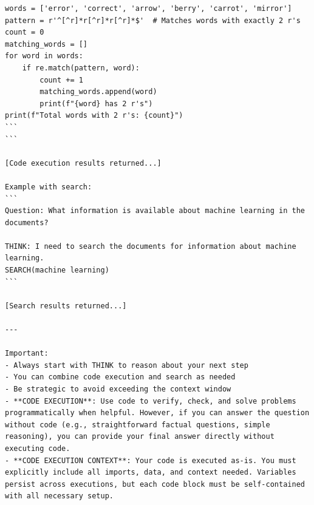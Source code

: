 \begin{lstlisting}[style=customstyle]
words = ['error', 'correct', 'arrow', 'berry', 'carrot', 'mirror']
pattern = r'^[^r]*r[^r]*r[^r]*$'  # Matches words with exactly 2 r's
count = 0
matching_words = []
for word in words:
    if re.match(pattern, word):
        count += 1
        matching_words.append(word)
        print(f"{word} has 2 r's")
print(f"Total words with 2 r's: {count}")
```
```

[Code execution results returned...]

Example with search:
```
Question: What information is available about machine learning in the documents?

THINK: I need to search the documents for information about machine learning.
SEARCH(machine learning)
```

[Search results returned...]

---

Important: 
- Always start with THINK to reason about your next step
- You can combine code execution and search as needed
- Be strategic to avoid exceeding the context window
- **CODE EXECUTION**: Use code to verify, check, and solve problems programmatically when helpful. However, if you can answer the question without code (e.g., straightforward factual questions, simple reasoning), you can provide your final answer directly without executing code.
- **CODE EXECUTION CONTEXT**: Your code is executed as-is. You must explicitly include all imports, data, and context needed. Variables persist across executions, but each code block must be self-contained with all necessary setup.
\end{lstlisting}


